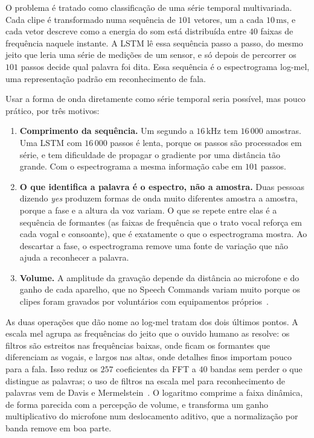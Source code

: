 \documentclass[11pt,a4paper]{article}
\newcommand{\w}[1]{\textit{#1}}
\begin{document}
O problema é tratado como classificação de uma série temporal multivariada. Cada clipe é transformado numa sequência de $101$ vetores, um a cada $10\,\mathrm{ms}$, e cada vetor descreve como a energia do som está distribuída entre $40$ faixas de frequência naquele instante. A LSTM lê essa sequência passo a passo, do mesmo jeito que leria uma série de medições de um sensor, e só depois de percorrer os $101$ passos decide qual palavra foi dita. Essa sequência é o espectrograma log-mel, uma representação padrão em reconhecimento de fala.

Usar a forma de onda diretamente como série temporal seria possível, mas pouco prático, por três motivos:
\begin{enumerate}
    \item \textbf{Comprimento da sequência.} Um segundo a $16\,\mathrm{kHz}$ tem $16\,000$ amostras. Uma LSTM com $16\,000$ passos é lenta, porque os passos são processados em série, e tem dificuldade de propagar o gradiente por uma distância tão grande. Com o espectrograma a mesma informação cabe em $101$ passos.
    \item \textbf{O que identifica a palavra é o espectro, não a amostra.} Duas pessoas dizendo \w{yes} produzem formas de onda muito diferentes amostra a amostra, porque a fase e a altura da voz variam. O que se repete entre elas é a sequência de formantes (as faixas de frequência que o trato vocal reforça em cada vogal e consoante), que é exatamente o que o espectrograma mostra. Ao descartar a fase, o espectrograma remove uma fonte de variação que não ajuda a reconhecer a palavra.
    \item \textbf{Volume.} A amplitude da gravação depende da distância ao microfone e do ganho de cada aparelho, que no Speech Commands variam muito porque os clipes foram gravados por voluntários com equipamentos próprios~\cite{warden2018}.
\end{enumerate}

As duas operações que dão nome ao log-mel tratam dos dois últimos pontos. A escala mel agrupa as frequências do jeito que o ouvido humano as resolve: os filtros são estreitos nas frequências baixas, onde ficam os formantes que diferenciam as vogais, e largos nas altas, onde detalhes finos importam pouco para a fala. Isso reduz os $257$ coeficientes da FFT a $40$ bandas sem perder o que distingue as palavras; o uso de filtros na escala mel para reconhecimento de palavras vem de Davis e Mermelstein~\cite{davis1980}. O logaritmo comprime a faixa dinâmica, de forma parecida com a percepção de volume, e transforma um ganho multiplicativo do microfone num deslocamento aditivo, que a normalização por banda remove em boa parte.
\end{document}
